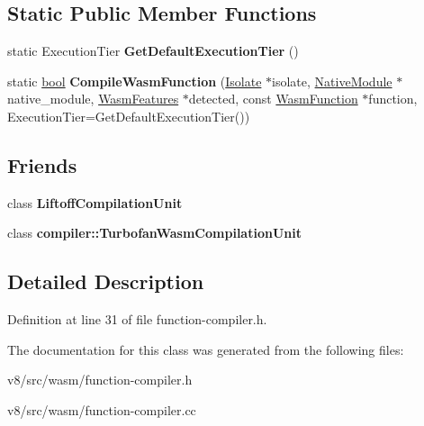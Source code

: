 \subsection*{Static Public Member Functions}
\begin{DoxyCompactItemize}
\item 
\mbox{\label{classv8_1_1internal_1_1wasm_1_1WasmCompilationUnit_a73df40a7f67b4bcf5ac9aa06eacf7c12}} 
static Execution\+Tier {\bfseries Get\+Default\+Execution\+Tier} ()
\item 
\mbox{\label{classv8_1_1internal_1_1wasm_1_1WasmCompilationUnit_adac01a6f097dced097e0bdabc48e53e6}} 
static \mbox{\hyperlink{classbool}{bool}} {\bfseries Compile\+Wasm\+Function} (\mbox{\hyperlink{classv8_1_1internal_1_1Isolate}{Isolate}} $\ast$isolate, \mbox{\hyperlink{classv8_1_1internal_1_1wasm_1_1NativeModule}{Native\+Module}} $\ast$native\+\_\+module, \mbox{\hyperlink{structv8_1_1internal_1_1wasm_1_1WasmFeatures}{Wasm\+Features}} $\ast$detected, const \mbox{\hyperlink{structv8_1_1internal_1_1wasm_1_1WasmFunction}{Wasm\+Function}} $\ast$function, Execution\+Tier=Get\+Default\+Execution\+Tier())
\end{DoxyCompactItemize}
\subsection*{Friends}
\begin{DoxyCompactItemize}
\item 
\mbox{\label{classv8_1_1internal_1_1wasm_1_1WasmCompilationUnit_ae5eb9c7f366f4e2b744988d8f56fe4ad}} 
class {\bfseries Liftoff\+Compilation\+Unit}
\item 
\mbox{\label{classv8_1_1internal_1_1wasm_1_1WasmCompilationUnit_a9d1b879cb4570290cd6863d376c93703}} 
class {\bfseries compiler\+::\+Turbofan\+Wasm\+Compilation\+Unit}
\end{DoxyCompactItemize}


\subsection{Detailed Description}


Definition at line 31 of file function-\/compiler.\+h.



The documentation for this class was generated from the following files\+:\begin{DoxyCompactItemize}
\item 
v8/src/wasm/function-\/compiler.\+h\item 
v8/src/wasm/function-\/compiler.\+cc\end{DoxyCompactItemize}

